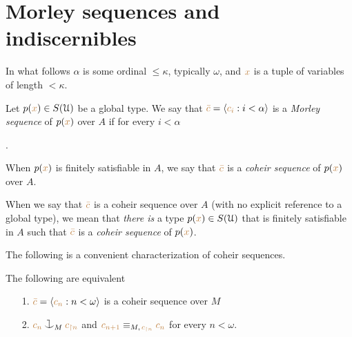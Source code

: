 \section{Morley sequences and indiscernibles}

In what follows $\alpha$ is some ordinal $\le\kappa$, typically $\omega$, and ${\color{brown} x}$ is a tuple of variables of length $<\kappa$.

Let \mbox{$p({\color{brown} x})\in S(\EuScript U)$} be a global type.
We say that ${\color{brown}\bar c}=\langle{\color{brown}c_i}:i<\alpha\rangle$ is a \emph{Morley sequence\/} of $p({\color{brown} x})$ over $A$ if for every $i<\alpha$

.

When $p({\color{brown} x})$ is finitely satisfiable in $A$, we say that ${\color{brown}\bar c}$ is a \emph{coheir sequence\/} of $p({\color{brown} x})$ over $A$.

When we say that ${\color{brown}\bar c}$ is a coheir sequence over $A$ (with no explicit reference to a global type), we mean that \textit{there is\/} a type $p({\color{brown} x})\in S(\EuScript U)$ that is finitely satisfiable in $A$ such that ${\color{brown}\bar c}$ is a \emph{coheir sequence\/} of $p({\color{brown} x})$.

The following is a convenient characterization of coheir sequences.

\begin{lemma}\label{lem_coheir_property}
The following are equivalent
\begin{itemize}
\item[1.] ${\color{brown}\bar c}=\langle{\color{brown}c_n}:n<\omega\rangle$ is a coheir sequence over $M$
\item[2.] ${\mr c_n}\cnonfork_M{\mr c_{\restriction n}}$ and ${\color{brown} c_{n+1}}\equiv_{M,\,{\color{brown} c_{\restriction n}}}{\color{brown} c_n}$ for every $n<\omega$.
\end{itemize}
\end{lemma}

